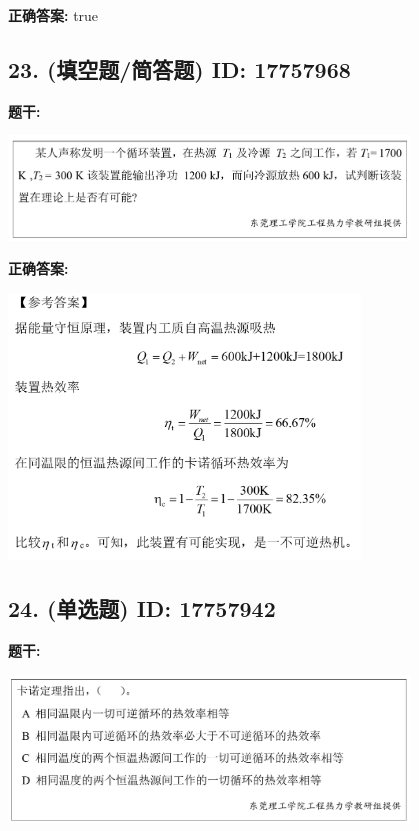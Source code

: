 \documentclass[12pt]{article}
\begin{document}
\textbf{正确答案:}
true

\vspace{0.5em}\hrulefill\vspace{1em}

\subsection*{23. (填空题/简答题) \small ID: 17757968}

\textbf{题干:}


\begin{center}\includegraphics[width=0.8\textwidth, height=0.25\textheight, keepaspectratio]{question_23_17757968/title_img_1.png}\end{center}

\textbf{正确答案:}

\begin{center}\includegraphics[width=0.7\textwidth, height=0.2\textheight, keepaspectratio]{question_23_17757968/correct_answer_1_img_1.png}\end{center}

\vspace{0.5em}\hrulefill\vspace{1em}

\subsection*{24. (单选题) \small ID: 17757942}

\textbf{题干:}


\begin{center}\includegraphics[width=0.8\textwidth, height=0.25\textheight, keepaspectratio]{question_24_17757942/title_img_1.png}\end{center}
\end{document}
